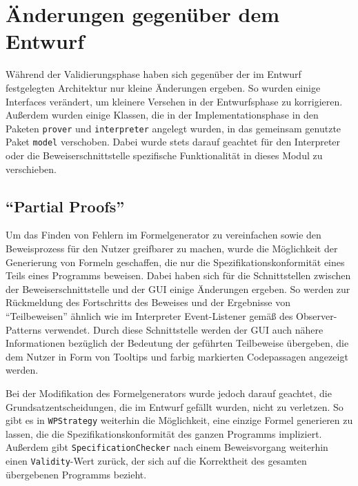 \section{Änderungen gegenüber dem Entwurf}

Während der Validierungsphase haben sich gegenüber der im Entwurf festgelegten Architektur nur kleine Änderungen ergeben. So wurden einige Interfaces verändert, um kleinere Versehen in der Entwurfsphase zu korrigieren. Außerdem wurden einige Klassen, die in der Implementationsphase in den Paketen \texttt{prover} und \texttt{interpreter} angelegt wurden, in das gemeinsam genutzte Paket \texttt{model} verschoben. Dabei wurde stets darauf geachtet für den Interpreter oder  die Beweiserschnittstelle spezifische Funktionalität in dieses Modul zu verschieben.

\subsection{"`Partial Proofs"'}

Um das Finden von Fehlern im Formelgenerator zu vereinfachen sowie den Beweisprozess für den Nutzer greifbarer zu machen, wurde die Möglichkeit der Generierung von Formeln geschaffen, die nur die Spezifikationskonformität eines Teils eines Programms beweisen. Dabei haben sich für die Schnittstellen zwischen der Beweiserschnittstelle und der GUI einige Änderungen ergeben. So werden zur Rückmeldung des Fortschritts des Beweises und der Ergebnisse von "`Teilbeweisen"' ähnlich wie im Interpreter Event-Listener gemäß des Observer-Patterns verwendet. Durch diese Schnittstelle werden der GUI auch nähere Informationen bezüglich der Bedeutung der geführten Teilbeweise übergeben, die dem Nutzer in Form von Tooltips und farbig markierten Codepassagen angezeigt werden.

Bei der Modifikation des Formelgenerators wurde jedoch darauf geachtet, die Grundsatzentscheidungen, die im Entwurf gefällt wurden, nicht zu verletzen. So gibt es in \texttt{WPStrategy} weiterhin die Möglichkeit, eine einzige Formel generieren zu lassen, die die Spezifikationskonformität des ganzen Programms impliziert. Außerdem gibt \texttt{SpecificationChecker} nach einem Beweisvorgang weiterhin einen \texttt{Validity}-Wert zurück, der sich auf die Korrektheit des gesamten übergebenen Programms bezieht.
